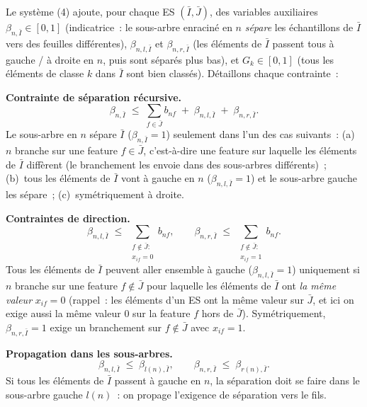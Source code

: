 \documentclass[a4paper,10pt,titlepage,leqno]{article}
\begin{document}
\begin{theorybox}

Le système (4) ajoute, pour chaque ES $(\bar{I}, \bar{J})$, des variables auxiliaires $\beta_{n,\bar{I}} \in [0,1]$ (indicatrice~: le sous-arbre enraciné en $n$ \emph{sépare} les échantillons de $\bar{I}$ vers des feuilles différentes), $\beta_{n,l,\bar{I}}$ et $\beta_{n,r,\bar{I}}$ (les éléments de $\bar{I}$ passent tous à gauche / à droite en $n$, puis sont séparés plus bas), et $G_k \in [0,1]$ (tous les éléments de classe $k$ dans $\bar{I}$ sont bien classés). Détaillons chaque contrainte~:

\medskip

\textbf{Contrainte de séparation récursive.}
\[
  \beta_{n,\bar{I}} \;\leq\; \sum_{f \in \bar{J}} b_{nf} \;+\; \beta_{n,l,\bar{I}} \;+\; \beta_{n,r,\bar{I}}.
\]
Le sous-arbre en $n$ sépare $\bar{I}$ ($\beta_{n,\bar{I}} = 1$) seulement dans l'un des cas suivants~: (a)~$n$ branche sur une feature $f \in \bar{J}$, c'est-à-dire une feature sur laquelle les éléments de $\bar{I}$ diffèrent (le branchement les envoie dans des sous-arbres différents)~; (b)~tous les éléments de $\bar{I}$ vont à gauche en $n$ ($\beta_{n,l,\bar{I}} = 1$) et le sous-arbre gauche les sépare~; (c)~symétriquement à droite.

\medskip

\textbf{Contraintes de direction.}
\[
  \beta_{n,l,\bar{I}} \;\leq\; \sum_{\substack{f \notin \bar{J} :\\ x_{if}=0}} b_{nf}, \qquad \beta_{n,r,\bar{I}} \;\leq\; \sum_{\substack{f \notin \bar{J} :\\ x_{if}=1}} b_{nf}.
\]
Tous les éléments de $\bar{I}$ peuvent aller ensemble à gauche ($\beta_{n,l,\bar{I}} = 1$) uniquement si $n$ branche sur une feature $f \notin \bar{J}$ pour laquelle les éléments de $\bar{I}$ ont \emph{la même valeur} $x_{if} = 0$ (rappel~: les éléments d'un ES ont la même valeur sur $\bar{J}$, et ici on exige aussi la même valeur $0$ sur la feature $f$ hors de $\bar{J}$). Symétriquement, $\beta_{n,r,\bar{I}} = 1$ exige un branchement sur $f \notin \bar{J}$ avec $x_{if} = 1$.

\medskip

\textbf{Propagation dans les sous-arbres.}
\[
  \beta_{n,l,\bar{I}} \;\leq\; \beta_{l(n),\bar{I}}, \qquad \beta_{n,r,\bar{I}} \;\leq\; \beta_{r(n),\bar{I}}.
\]
Si tous les éléments de $\bar{I}$ passent à gauche en $n$, la séparation doit se faire dans le sous-arbre gauche $l(n)$~: on propage l'exigence de séparation vers le fils.


\end{theorybox}
\end{document}
